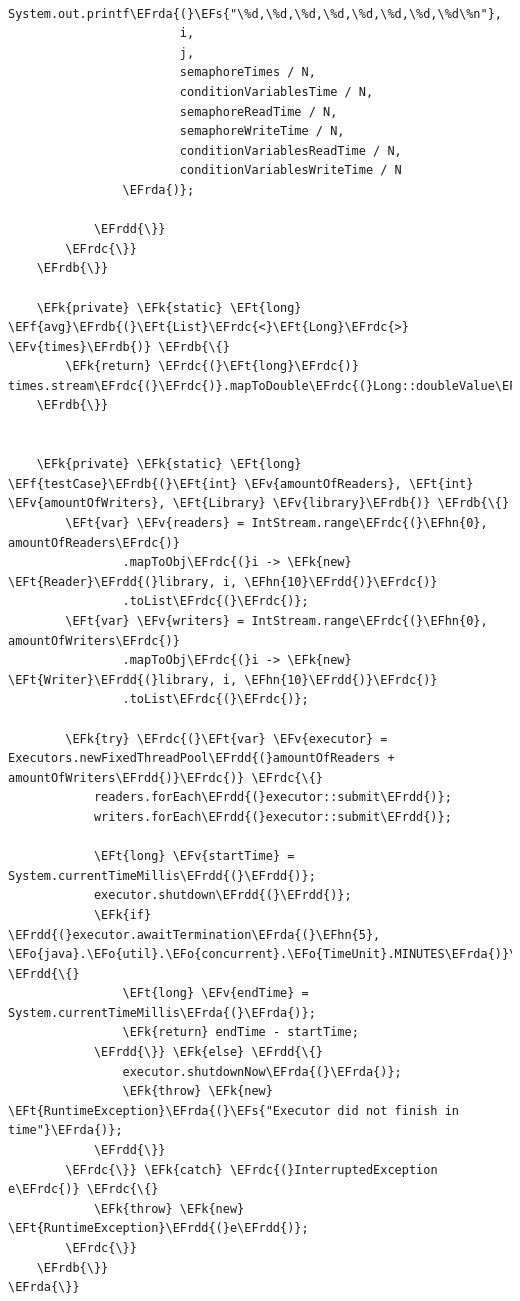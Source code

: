 \documentclass[11pt]{article}
\newcommand{\EFs}[1]{\textcolor{EFs}{#1}} %
\newcommand{\EFk}[1]{\textcolor{EFk}{#1}} %
\newcommand{\EFf}[1]{\textcolor{EFf}{#1}} %
\newcommand{\EFv}[1]{\textcolor{EFv}{#1}} %
\newcommand{\EFt}[1]{\textcolor{EFt}{#1}} %
\newcommand{\EFo}[1]{\textcolor{EFo}{#1}} %
\newcommand{\EFhn}[1]{\textcolor{EFhn}{#1}} %
\newcommand{\EFrda}[1]{#1} %
\newcommand{\EFrdb}[1]{\textcolor{EFrdb}{#1}} %
\newcommand{\EFrdc}[1]{\textcolor{EFrdc}{#1}} %
\newcommand{\EFrdd}[1]{\textcolor{EFrdd}{#1}} %
\begin{document}
\begin{Code}
\begin{Verbatim}
                System.out.printf\EFrda{(}\EFs{"\%d,\%d,\%d,\%d,\%d,\%d,\%d,\%d\%n"},
                        i,
                        j,
                        semaphoreTimes / N,
                        conditionVariablesTime / N,
                        semaphoreReadTime / N,
                        semaphoreWriteTime / N,
                        conditionVariablesReadTime / N,
                        conditionVariablesWriteTime / N
                \EFrda{)};

            \EFrdd{\}}
        \EFrdc{\}}
    \EFrdb{\}}

    \EFk{private} \EFk{static} \EFt{long} \EFf{avg}\EFrdb{(}\EFt{List}\EFrdc{<}\EFt{Long}\EFrdc{>} \EFv{times}\EFrdb{)} \EFrdb{\{}
        \EFk{return} \EFrdc{(}\EFt{long}\EFrdc{)} times.stream\EFrdc{(}\EFrdc{)}.mapToDouble\EFrdc{(}Long::doubleValue\EFrdc{)}.average\EFrdc{(}\EFrdc{)}.orElseThrow\EFrdc{(}\EFrdc{)};
    \EFrdb{\}}


    \EFk{private} \EFk{static} \EFt{long} \EFf{testCase}\EFrdb{(}\EFt{int} \EFv{amountOfReaders}, \EFt{int} \EFv{amountOfWriters}, \EFt{Library} \EFv{library}\EFrdb{)} \EFrdb{\{}
        \EFt{var} \EFv{readers} = IntStream.range\EFrdc{(}\EFhn{0}, amountOfReaders\EFrdc{)}
                .mapToObj\EFrdc{(}i -> \EFk{new} \EFt{Reader}\EFrdd{(}library, i, \EFhn{10}\EFrdd{)}\EFrdc{)}
                .toList\EFrdc{(}\EFrdc{)};
        \EFt{var} \EFv{writers} = IntStream.range\EFrdc{(}\EFhn{0}, amountOfWriters\EFrdc{)}
                .mapToObj\EFrdc{(}i -> \EFk{new} \EFt{Writer}\EFrdd{(}library, i, \EFhn{10}\EFrdd{)}\EFrdc{)}
                .toList\EFrdc{(}\EFrdc{)};

        \EFk{try} \EFrdc{(}\EFt{var} \EFv{executor} = Executors.newFixedThreadPool\EFrdd{(}amountOfReaders + amountOfWriters\EFrdd{)}\EFrdc{)} \EFrdc{\{}
            readers.forEach\EFrdd{(}executor::submit\EFrdd{)};
            writers.forEach\EFrdd{(}executor::submit\EFrdd{)};

            \EFt{long} \EFv{startTime} = System.currentTimeMillis\EFrdd{(}\EFrdd{)};
            executor.shutdown\EFrdd{(}\EFrdd{)};
            \EFk{if} \EFrdd{(}executor.awaitTermination\EFrda{(}\EFhn{5}, \EFo{java}.\EFo{util}.\EFo{concurrent}.\EFo{TimeUnit}.MINUTES\EFrda{)}\EFrdd{)} \EFrdd{\{}
                \EFt{long} \EFv{endTime} = System.currentTimeMillis\EFrda{(}\EFrda{)};
                \EFk{return} endTime - startTime;
            \EFrdd{\}} \EFk{else} \EFrdd{\{}
                executor.shutdownNow\EFrda{(}\EFrda{)};
                \EFk{throw} \EFk{new} \EFt{RuntimeException}\EFrda{(}\EFs{"Executor did not finish in time"}\EFrda{)};
            \EFrdd{\}}
        \EFrdc{\}} \EFk{catch} \EFrdc{(}InterruptedException e\EFrdc{)} \EFrdc{\{}
            \EFk{throw} \EFk{new} \EFt{RuntimeException}\EFrdd{(}e\EFrdd{)};
        \EFrdc{\}}
    \EFrdb{\}}
\EFrda{\}}
\end{Verbatim}
\end{Code}
\end{document}
